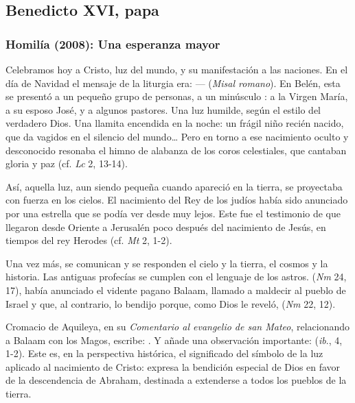 \newsection
			
	
		\subsection{Benedicto XVI, papa}
		
			\subsubsection{Homilía (2008): Una esperanza mayor}
			
				
				\begin{body}
					Celebramos hoy a Cristo, luz del mundo, y su manifestación a las naciones. En el día de Navidad el mensaje de la liturgia era:  ---  (\emph{Misal romano}). En Belén, esta  se presentó a un pequeño grupo de personas, a un minúsculo : a la Virgen María, a su esposo José, y a algunos pastores. Una luz humilde, según el estilo del verdadero Dios. Una llamita encendida en la noche: un frágil niño recién nacido, que da vagidos en el silencio del mundo\ldots{} Pero en torno a ese nacimiento oculto y desconocido resonaba el himno de alabanza de los coros celestiales, que cantaban gloria y paz (cf. \emph{Lc} 2, 13-14).
					
					Así, aquella luz, aun siendo pequeña cuando apareció en la tierra, se proyectaba con fuerza en los cielos. El nacimiento del Rey de los judíos había sido anunciado por una estrella que se podía ver desde muy lejos. Este fue el testimonio de  que llegaron desde Oriente a Jerusalén poco después del nacimiento de Jesús, en tiempos del rey Herodes (cf. \emph{Mt} 2, 1-2).
					
					Una vez más, se comunican y se responden el cielo y la tierra, el cosmos y la historia. Las antiguas profecías se cumplen con el lenguaje de los astros.  (\emph{Nm} 24, 17), había anunciado el vidente pagano Balaam, llamado a maldecir al pueblo de Israel y que, al contrario, lo bendijo porque, como Dios le reveló,  (\emph{Nm} 22, 12).
					
					Cromacio de Aquileya, en su \emph{Comentario al evangelio de san Mateo}, relacionando a Balaam con los Magos, escribe: . Y añade una observación importante:  (\emph{ib}., 4, 1-2). Este es, en la perspectiva histórica, el significado del símbolo de la luz aplicado al nacimiento de Cristo: expresa la bendición especial de Dios en favor de la descendencia de Abraham, destinada a extenderse a todos los pueblos de la tierra.
					

\end{body}
